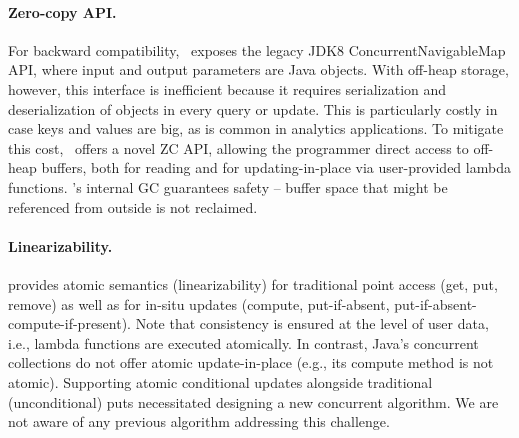 \vspace{-10pt}
\paragraph{Zero-copy API.} 
For backward compatibility, \oak\ exposes the legacy JDK8 ConcurrentNavigableMap API, where
input and output parameters
are Java objects. With off-heap storage, however, this interface is inefficient because it requires serialization and deserialization of objects in every query or update.  
This is particularly costly in case keys and values are big, as is common in analytics applications. 
To mitigate this cost, \oak\ offers a novel 
ZC API,  allowing the programmer  direct access to off-heap buffers, both for reading and for updating-in-place 
via user-provided lambda functions. 
%
\oak's internal GC guarantees safety --  buffer space that might be 
referenced from outside \oak\/ is not reclaimed. 



\paragraph{Linearizability.} 
\oak\/ provides atomic semantics (linearizability) for traditional point access (get, put, remove) as well as  
for in-situ updates (compute, put-if-absent, put-if-absent-compute-if-present). 
Note that consistency is ensured at the level of user data, i.e., lambda functions are executed atomically.
In contrast, Java's concurrent collections do not offer atomic update-in-place (e.g., its compute method is not atomic).
Supporting atomic conditional updates alongside traditional 
(unconditional) puts necessitated designing a new concurrent algorithm. We are not aware of any previous algorithm addressing this challenge. 



